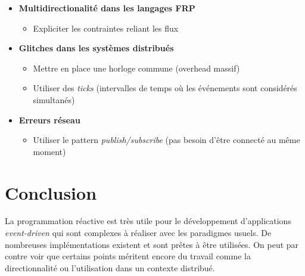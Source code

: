 \documentclass[10pt,final]{IEEEtran}
\begin{document}
\begin{itemize}
    \item \textbf{Multidirectionalité dans les langages FRP}
        \begin{itemize}
            \item Expliciter les contraintes reliant les flux 
        \end{itemize}
    \item \textbf{Glitches dans les systèmes distribués}
        \begin{itemize}
            \item Mettre en place une horloge commune (overhead massif)
            \item Utiliser des \textit{ticks} (intervalles de temps où les événements sont considérés simultanés)
        \end{itemize}
    \item \textbf{Erreurs réseau}
        \begin{itemize}
            \item Utiliser le pattern \textit{publish/subscribe} (pas besoin d'être connecté au même moment)
        \end{itemize}
\end{itemize}

\section{Conclusion}

La programmation réactive est très utile pour le développement d'applications \textit{event-driven} qui sont complexes à réaliser avec les paradigmes usuels. De nombreuses implémentations existent et sont prêtes à être utilisées. On peut par contre voir que certains points méritent encore du travail comme la directionnalité ou l'utilisation dans un contexte distribué.
\end{document}
